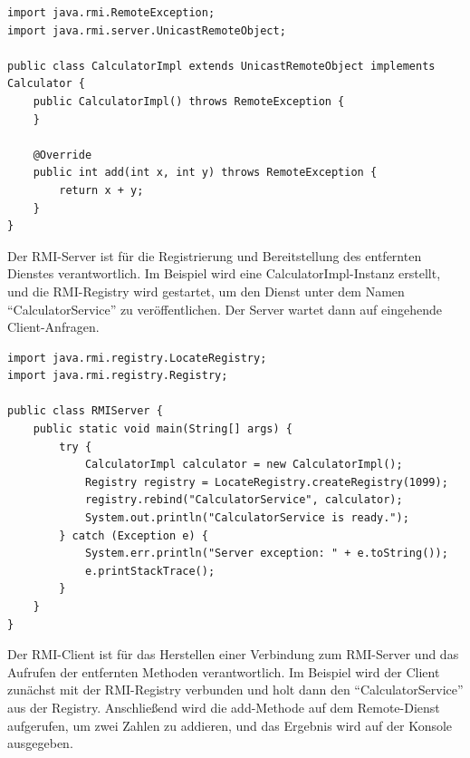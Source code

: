 \noindent\begin{minipage}{\textwidth}
\begin{lstlisting}[caption={Remote-Interface Implementierung (CalculatorImpl.java.java)},captionpos=b,label={lst:rmi-server}]
import java.rmi.RemoteException;
import java.rmi.server.UnicastRemoteObject;

public class CalculatorImpl extends UnicastRemoteObject implements Calculator {
    public CalculatorImpl() throws RemoteException {
    }

    @Override
    public int add(int x, int y) throws RemoteException {
        return x + y;
    }
}
\end{lstlisting}
\end{minipage}
Der RMI-Server ist für die Registrierung und Bereitstellung des entfernten Dienstes verantwortlich. Im Beispiel wird eine CalculatorImpl-Instanz erstellt, und die RMI-Registry wird gestartet, um den Dienst unter dem Namen \enquote{CalculatorService} zu veröffentlichen. Der Server wartet dann auf eingehende Client-Anfragen.

\noindent\begin{minipage}{\textwidth}
\begin{lstlisting}[caption={ RMI-Server (RMIServer.java)},captionpos=b,label={lst:rmi-server}]
import java.rmi.registry.LocateRegistry;
import java.rmi.registry.Registry;

public class RMIServer {
    public static void main(String[] args) {
        try {
            CalculatorImpl calculator = new CalculatorImpl();
            Registry registry = LocateRegistry.createRegistry(1099);
            registry.rebind("CalculatorService", calculator);
            System.out.println("CalculatorService is ready.");
        } catch (Exception e) {
            System.err.println("Server exception: " + e.toString());
            e.printStackTrace();
        }
    }
}
\end{lstlisting}
\end{minipage}
Der RMI-Client ist für das Herstellen einer Verbindung zum RMI-Server und das Aufrufen der entfernten Methoden verantwortlich. Im Beispiel wird der Client zunächst mit der RMI-Registry verbunden und holt dann den \enquote{CalculatorService} aus der Registry. Anschließend wird die add-Methode auf dem Remote-Dienst aufgerufen, um zwei Zahlen zu addieren, und das Ergebnis wird auf der Konsole ausgegeben.

